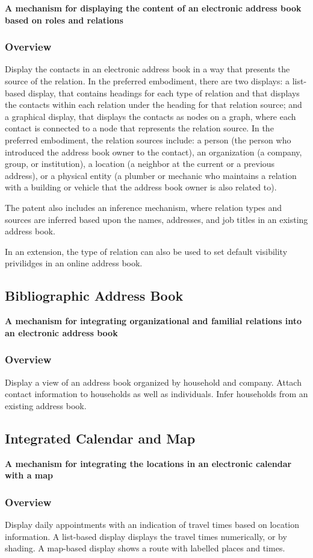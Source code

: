 \documentclass{article}
\newcommand{\ptitle}[1]{\textbf{#1}}
\newcommand{\poverview}{\subsubsection{Overview}}
\begin{document}
\ptitle{A mechanism for displaying the content of an electronic address book based on roles and relations}

\poverview
Display the contacts in an electronic address book in a way that presents the source of the relation.  In the preferred embodiment, there are two displays: a list-based display, that contains headings for each type of relation and that displays the contacts within each relation under the heading for that relation source; and a graphical display, that displays the contacts as nodes on a graph, where each contact is connected to a node that represents the relation source.  In the preferred embodiment, the relation sources include: a person (the person who introduced the address book owner to the contact), an organization (a company, group, or institution), a location (a neighbor at the current or a previous address), or a physical entity (a plumber or mechanic who maintains a relation with a building or vehicle that the address book owner is also related to).

The patent also includes an inference mechanism, where relation types and sources are inferred based upon the names, addresses, and job titles in an existing address book.

In an extension, the type of relation can also be used to set default visibility privilidges in an online address book.



\subsection{Bibliographic Address Book}
\ptitle{A mechanism for integrating organizational and familial relations into an electronic address book}

\poverview
Display a view of an address book organized by household and company.  Attach contact information to households as well as individuals.  Infer households from an existing address book.


\subsection{Integrated Calendar and Map}

\ptitle{A mechanism for integrating the locations in an electronic calendar with a map}

\poverview
Display daily appointments with an indication of travel times based on location information.  A list-based display displays the travel times numerically, or by shading.  A map-based display shows a route with labelled places and times.
\end{document}
